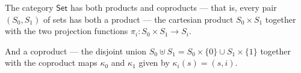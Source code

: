\begin{example}
	The category $\mathsf{Set}$ has both products and coproducts --- 
	that is, 
	every pair $(S_0,S_1)$ of sets has both a product 
	--- 
	the cartesian product $S_0 \times S_1$ together with the two projection functions $\pi_i \colon S_0 \times S_1 \to S_i$. 


	\begin{center}
	\end{center}


	And a coproduct ---
	the disjoint union $S_0 \uplus  S_1 = S_0 \times \{0\} \cup S_1 \times \{1\}$ together with the coproduct maps $\kappa_0$ and $\kappa_1$ given by 
	$\kappa_i(s) = (s,i)$.


	\begin{center}
	\end{center}
\end{example}



\clearpage
